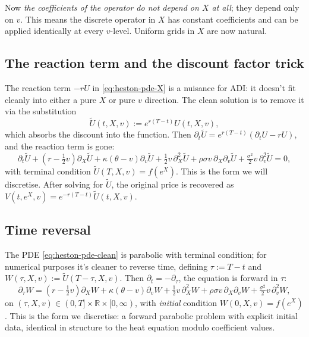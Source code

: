 \documentclass[11pt]{article}
\theoremstyle{plain}
\theoremstyle{definition}
\theoremstyle{remark}
\begin{document}
Now \emph{the coefficients of the operator do not depend on $X$ at all}; they depend only on $v$. This means the discrete operator in $X$ has constant coefficients and can be applied identically at every $v$-level. Uniform grids in $X$ are now natural.

\subsection{The reaction term and the discount factor trick}

The reaction term $-r U$ in \eqref{eq:heston-pde-X} is a nuisance for ADI: it doesn't fit cleanly into either a pure $X$ or pure $v$ direction. The clean solution is to remove it via the substitution
\[
    \tilde U(t, X, v) := e^{r(T - t)} U(t, X, v),
\]
which absorbs the discount into the function. Then $\partial_t \tilde U = e^{r(T - t)} (\partial_t U - r U)$, and the reaction term is gone:
\begin{equation}
    \partial_t \tilde U + (r - \tfrac12 v) \partial_X \tilde U + \kappa(\theta - v) \partial_v \tilde U + \tfrac12 v\, \partial^2_X \tilde U + \rho\sigma v\, \partial_X \partial_v \tilde U + \tfrac{\sigma^2}{2} v\, \partial^2_v \tilde U = 0,                                                                                                                      \label{eq:heston-pde-clean}
\end{equation}
with terminal condition $\tilde U(T, X, v) = f(e^X)$. This is the form we will discretise. After solving for $\tilde U$, the original price is recovered as $V(t, e^X, v) = e^{-r(T - t)} \tilde U(t, X, v)$.

\subsection{Time reversal}

The PDE \eqref{eq:heston-pde-clean} is parabolic with terminal condition; for numerical purposes it's cleaner to reverse time, defining $\tau := T - t$ and $W(\tau, X, v) := \tilde U(T - \tau, X, v)$. Then $\partial_t = -\partial_\tau$, the equation is forward in $\tau$:
\begin{equation}
    \partial_\tau W = (r - \tfrac12 v) \partial_X W + \kappa(\theta - v) \partial_v W + \tfrac12 v\, \partial^2_X W + \rho\sigma v\, \partial_X \partial_v W + \tfrac{\sigma^2}{2} v\, \partial^2_v W,                                  \label{eq:heston-pde-tau}
\end{equation}
on $(\tau, X, v) \in (0, T] \times \mathbb{R} \times [0, \infty)$, with \emph{initial} condition $W(0, X, v) = f(e^X)$. This is the form we discretise: a forward parabolic problem with explicit initial data, identical in structure to the heat equation modulo coefficient values.
\end{document}
